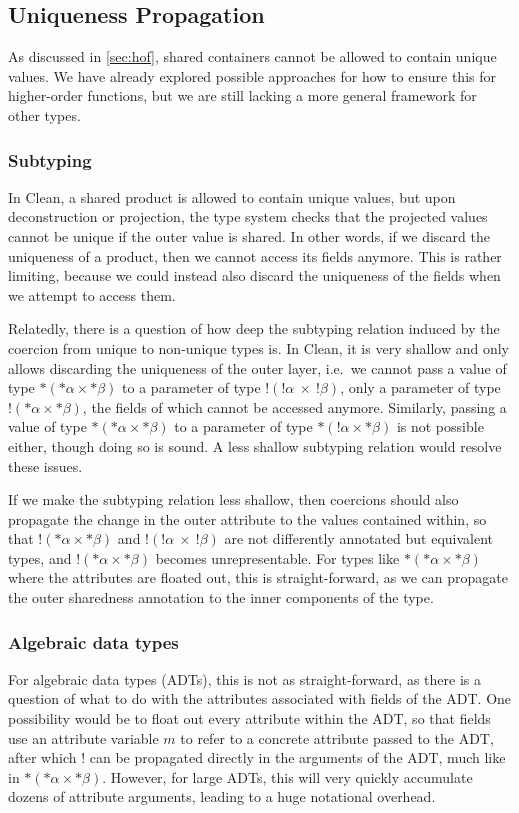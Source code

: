 \subsection{Uniqueness Propagation}
As discussed in \cref{sec:hof}, shared containers cannot be allowed to contain unique values. We have already explored possible approaches for how to ensure this for higher-order functions, but we are still lacking a more general framework for other types.

\subsubsection{Subtyping}
In Clean, a shared product is allowed to contain unique values, but upon deconstruction or projection, the type system checks that the projected values cannot be unique if the outer value is shared. In other words, if we discard the uniqueness of a product, then we cannot access its fields anymore. This is rather limiting, because we could instead also discard the uniqueness of the fields when we attempt to access them. 

Relatedly, there is a question of how deep the subtyping relation induced by the coercion from unique to non-unique types is. In Clean, it is very shallow and only allows discarding the uniqueness of the outer layer, i.e.\ we cannot pass a value of type $*(*\alpha \times *\beta)$ to a parameter of type $!(!\alpha\ \times\ !\beta)$, only a parameter of type $!(*\alpha \times *\beta)$, the fields of which cannot be accessed anymore. Similarly, passing a value of type $*(*\alpha \times *\beta)$ to a parameter of type $*(!\alpha \times *\beta)$ is not possible either, though doing so is sound. A less shallow subtyping relation would resolve these issues.

If we make the subtyping relation less shallow, then coercions should also propagate the change in the outer attribute to the values contained within, so that $!(*\alpha \times *\beta)$ and $!(!\alpha\ \times\ !\beta)$ are not differently annotated but equivalent types, and $!(*\alpha \times *\beta)$ becomes unrepresentable. For types like $*(*\alpha \times *\beta)$ where the attributes are floated out, this is straight-forward, as we can propagate the outer sharedness annotation to the inner components of the type.

\subsubsection{Algebraic data types}
For algebraic data types (ADTs), this is not as straight-forward, as there is a question of what to do with the attributes associated with fields of the ADT. One possibility would be to float out every attribute within the ADT, so that fields use an attribute variable $m$ to refer to a concrete attribute passed to the ADT, after which $!$ can be propagated directly in the arguments of the ADT, much like in $*(*\alpha \times *\beta)$. However, for large ADTs, this will very quickly accumulate dozens of attribute arguments, leading to a huge notational overhead.

